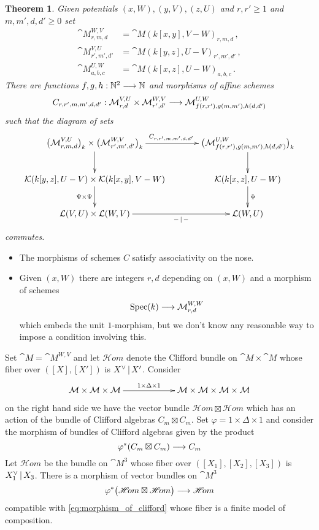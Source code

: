 \documentclass[english,letter paper,12pt,leqno]{article}
\newtheorem{theorem}{Theorem}[section]
\theoremstyle{example}
\numberwithin{equation}{section}
\def\be{\begin{equation}}
\def\ee{\end{equation}}
\DeclareMathOperator{\Spec}{Spec}
\begin{document}
\begin{theorem} Given potentials $(x,W), (y,V), (z,U)$ and $r,r' \ge 1$ and $m,m',d,d' \ge 0$ set
\begin{align*}
\cat{M}^{W,V}_{r,m,d} &= \cat{M}( k[x,y], V - W )_{r,m,d}\,,\\
\cat{M}^{V,U}_{r',m',d'} &= \cat{M}( k[y,z], U - V )_{r',m',d'}\,,\\
\cat{M}^{U,W}_{a, b,c} &= \cat{M}( k[x,z], U - W )_{a,b,c}\,.
\end{align*}
There are functions $f,g,h: \mathbb{N}^2 \longrightarrow \mathbb{N}$ and morphisms of affine schemes
\[
C_{r,r',m,m',d,d'}: \mathcal{M}^{V,U}_{r,d} \times \mathcal{M}_{r',d'}^{W,V} \longrightarrow \mathcal{M}_{f(r,r'), g(m,m'),h(d,d')}^{U, W}
\]
such that the diagram of sets
\[
\xymatrix@C+1pc{
\big( \cat{M}^{V,U}_{r,m,d} \big)_k \times \big( \cat{M}_{r',m',d'}^{W,V} \big)_k \ar[d] \ar[r]^{C_{r,r',m,m',d,d'}} & \big( \cat{M}_{f(r,r'), g(m,m'),h(d,d')}^{U, W} \big)_k \ar[d]\\
\cat{K}( k[y,z], U - V ) \times \cat{K}( k[x,y], V - W ) \ar[d]_-{\Psi \times \Psi} & \cat{K}( k[x,z], U - W )\ar[d]^-{\Psi} \\
\cat{L}( V, U ) \times \cat{L}( W, V ) \ar[r]_-{-\l-} & \cat{L}(W,U)
}
\]
commutes.
\end{theorem}

\begin{itemize}
\item The morphisms of schemes $C$ satisfy associativity on the nose. 
\item Given $(x,W)$ there are integers $r,d$ depending on $(x,W)$ and a morphism of schemes
\[
\Spec(k) \lto \cat{M}^{W,W}_{r,d}
\]
which embeds the unit $1$-morphism, but we don't know any reasonable way to impose a condition involving this.
\end{itemize}

Set $\cat{M} = \cat{M}^{W,V}$ and let $\mathscr{H}\!om$ denote the Clifford bundle on $\cat{M} \times \cat{M}$ whose fiber over $( [X], [X'] )$ is $X^{\vee} \,|\, X'$. Consider
\[
\xymatrix@C+3pc{
\cat{M} \times \cat{M} \times \cat{M} \ar[r]^-{1 \times \Delta \times 1} & \cat{M} \times \cat{M} \times \cat{M} \times \cat{M}
}
\]
on the right hand side we have the vector bundle $\mathscr{H}\!om \boxtimes \mathscr{H}\!om$ which has an action of the bundle of Clifford algebras $C_m \boxtimes C_m$. Set $\varphi = 1 \times \Delta \times 1$ and consider the morphism of bundles of Clifford algebras given by the product
\be\label{eq:morphism_of_clifford}
\varphi^*( C_m \boxtimes C_m ) \lto C_m
\ee
Let $\mathscr{H}\!om$ be the bundle on $\cat{M}^3$ whose fiber over $([X_1], [X_2], [X_3])$ is $X_1^{\vee} \,|\, X_3$. There is a morphism of vector bundles on $\cat{M}^3$
\[
\varphi^*\big( \mathscr{H}\!om \boxtimes \mathscr{H}\!om \big) \longrightarrow \mathscr{H}\!om
\]
compatible with \eqref{eq:morphism_of_clifford} whose fiber is a finite model of composition.
\end{document}
